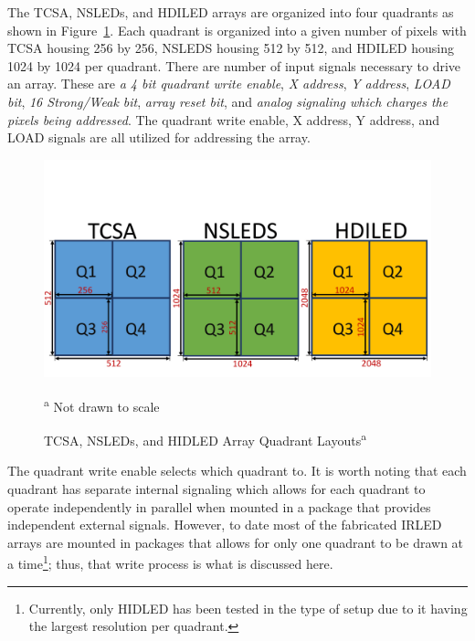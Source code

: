    The TCSA, NSLEDs, and HDILED arrays are organized into four quadrants as shown in Figure~\ref{fig:tcsa_nsleds_hdiled_quads}. Each quadrant is organized into a given number of pixels with TCSA housing 256 by 256, NSLEDS housing 512 by 512, and HDILED housing 1024 by 1024 per quadrant. There are number of input signals necessary to drive an array. These are {\em a 4 bit quadrant write enable}, {\em X address}, {\em Y address}, {\em LOAD bit}, {\em 16 Strong/Weak bit}, {\em array reset bit}, and {\em analog signaling which charges the pixels being addressed}. The quadrant write enable, X address, Y address, and LOAD signals are all utilized for addressing the array.

    \begin{figure}
        \centering
        \includegraphics[trim=0in 0.35in 0in 1.5in,width=1.0\textwidth]{fig/tcsa_nsleds_hdiled_quads.pdf}
        \caption[TCSA, NSLEDs, and HIDLED Array Quadrant Layouts]{TCSA, NSLEDs, and HIDLED Array Quadrant Layouts\textsuperscript{a}}
        \vspace{-8px}
        \footnotesize\textsuperscript{a} Not drawn to scale
        \label{fig:tcsa_nsleds_hdiled_quads}
    \end{figure}

    The quadrant write enable selects which quadrant to. It is worth noting that each quadrant has separate internal signaling which allows for each quadrant to operate independently in parallel when mounted in a package that provides independent external signals. However, to date most of the fabricated IRLED arrays are mounted in packages that allows for only one quadrant to be drawn at a time\footnote{Currently, only HIDLED has been tested in the type of setup\cite{lassiter1, LassiterEtAl2019_1, LassiterEtAl2019_2, lassiter3} due to it having the largest resolution per quadrant.}; thus, that write process is what is discussed here.

